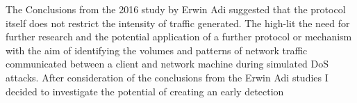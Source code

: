 

The Conclusions from the 2016 study by Erwin Adi suggested that the protocol itself does not restrict the intensity of traffic generated. The high-lit the need for further research and the potential application of a further protocol or mechanism with the aim of identifying the volumes and patterns of network traffic communicated between a client and network machine during simulated DoS attacks. After consideration of the conclusions from the Erwin Adi studies I decided to investigate the potential of creating an early detection 